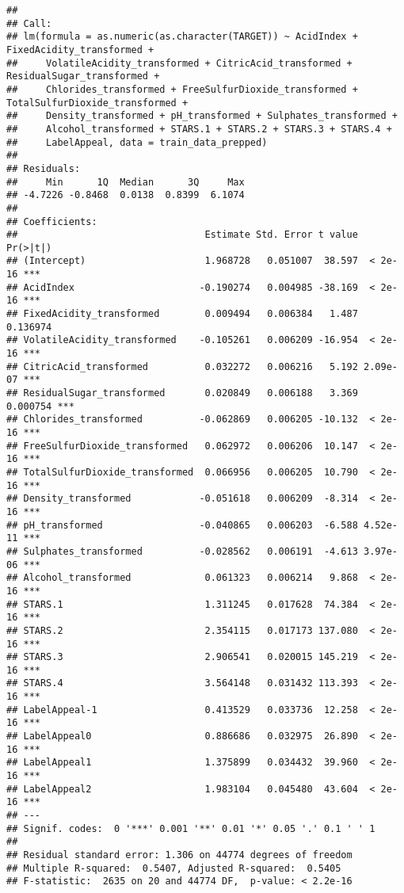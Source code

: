 \documentclass[
]{article}
\begin{document}
\begin{verbatim}
## 
## Call:
## lm(formula = as.numeric(as.character(TARGET)) ~ AcidIndex + FixedAcidity_transformed + 
##     VolatileAcidity_transformed + CitricAcid_transformed + ResidualSugar_transformed + 
##     Chlorides_transformed + FreeSulfurDioxide_transformed + TotalSulfurDioxide_transformed + 
##     Density_transformed + pH_transformed + Sulphates_transformed + 
##     Alcohol_transformed + STARS.1 + STARS.2 + STARS.3 + STARS.4 + 
##     LabelAppeal, data = train_data_prepped)
## 
## Residuals:
##     Min      1Q  Median      3Q     Max 
## -4.7226 -0.8468  0.0138  0.8399  6.1074 
## 
## Coefficients:
##                                 Estimate Std. Error t value Pr(>|t|)    
## (Intercept)                     1.968728   0.051007  38.597  < 2e-16 ***
## AcidIndex                      -0.190274   0.004985 -38.169  < 2e-16 ***
## FixedAcidity_transformed        0.009494   0.006384   1.487 0.136974    
## VolatileAcidity_transformed    -0.105261   0.006209 -16.954  < 2e-16 ***
## CitricAcid_transformed          0.032272   0.006216   5.192 2.09e-07 ***
## ResidualSugar_transformed       0.020849   0.006188   3.369 0.000754 ***
## Chlorides_transformed          -0.062869   0.006205 -10.132  < 2e-16 ***
## FreeSulfurDioxide_transformed   0.062972   0.006206  10.147  < 2e-16 ***
## TotalSulfurDioxide_transformed  0.066956   0.006205  10.790  < 2e-16 ***
## Density_transformed            -0.051618   0.006209  -8.314  < 2e-16 ***
## pH_transformed                 -0.040865   0.006203  -6.588 4.52e-11 ***
## Sulphates_transformed          -0.028562   0.006191  -4.613 3.97e-06 ***
## Alcohol_transformed             0.061323   0.006214   9.868  < 2e-16 ***
## STARS.1                         1.311245   0.017628  74.384  < 2e-16 ***
## STARS.2                         2.354115   0.017173 137.080  < 2e-16 ***
## STARS.3                         2.906541   0.020015 145.219  < 2e-16 ***
## STARS.4                         3.564148   0.031432 113.393  < 2e-16 ***
## LabelAppeal-1                   0.413529   0.033736  12.258  < 2e-16 ***
## LabelAppeal0                    0.886686   0.032975  26.890  < 2e-16 ***
## LabelAppeal1                    1.375899   0.034432  39.960  < 2e-16 ***
## LabelAppeal2                    1.983104   0.045480  43.604  < 2e-16 ***
## ---
## Signif. codes:  0 '***' 0.001 '**' 0.01 '*' 0.05 '.' 0.1 ' ' 1
## 
## Residual standard error: 1.306 on 44774 degrees of freedom
## Multiple R-squared:  0.5407, Adjusted R-squared:  0.5405 
## F-statistic:  2635 on 20 and 44774 DF,  p-value: < 2.2e-16
\end{verbatim}
\end{document}
